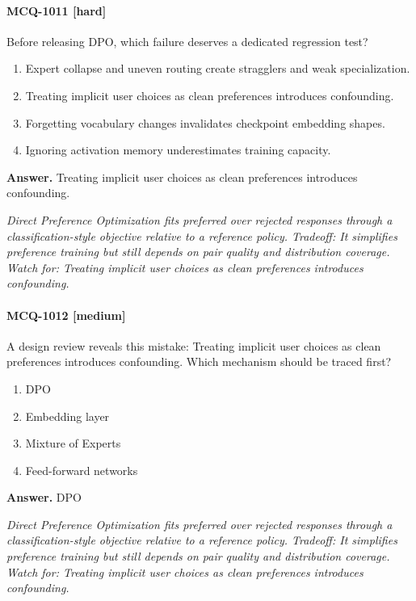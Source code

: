 \paragraph{MCQ-1011 [hard]} Before releasing DPO, which failure deserves a dedicated regression test?
\begin{enumerate}[label=\Alph*.]
\item Expert collapse and uneven routing create stragglers and weak specialization.
\item Treating implicit user choices as clean preferences introduces confounding.
\item Forgetting vocabulary changes invalidates checkpoint embedding shapes.
\item Ignoring activation memory underestimates training capacity.
\end{enumerate}
\noindent\textbf{Answer.} Treating implicit user choices as clean preferences introduces confounding.
\par\textit{Direct Preference Optimization fits preferred over rejected responses through a classification-style objective relative to a reference policy. Tradeoff: It simplifies preference training but still depends on pair quality and distribution coverage. Watch for: Treating implicit user choices as clean preferences introduces confounding.}
\paragraph{MCQ-1012 [medium]} A design review reveals this mistake: Treating implicit user choices as clean preferences introduces confounding. Which mechanism should be traced first?
\begin{enumerate}[label=\Alph*.]
\item DPO
\item Embedding layer
\item Mixture of Experts
\item Feed-forward networks
\end{enumerate}
\noindent\textbf{Answer.} DPO
\par\textit{Direct Preference Optimization fits preferred over rejected responses through a classification-style objective relative to a reference policy. Tradeoff: It simplifies preference training but still depends on pair quality and distribution coverage. Watch for: Treating implicit user choices as clean preferences introduces confounding.}
